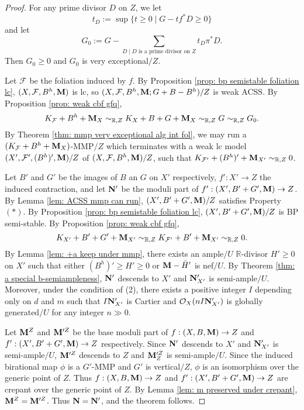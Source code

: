 \documentclass[11pt]{amsart}
\numberwithin{equation}{section}
\newcommand{\Mm}{{\bf{M}}}
\newcommand{\Nn}{{\bf{N}}}
\newcommand{\Rr}{\mathbb{R}}
\newcommand{\Ff}{\mathcal{F}}
\theoremstyle{definition}
\theoremstyle{definition}
\theoremstyle{definition}
\begin{document}
\begin{proof}
For any prime divisor $D$ on $Z$, we let 
$$t_D:=\sup\{t\geq 0\mid G-tf^*D\geq 0\}$$
and let 
$$G_0:=G-\sum_{D\mid D\text{ is a prime divisor on }Z}t_D\pi^*D.$$ 
Then $G_0\geq 0$ and $G_0$ is very exceptional$/Z$.

Let $\Ff$ be the foliation induced by $f$. By Proposition \ref{prop: bp semistable foliation lc}, $(X,\Ff,B^h,\Mm)$ is lc, so $(X,\Ff,B^h,\Mm;G+B-B^h)/Z$ is weak ACSS. By Proposition \ref{prop: weak cbf gfq}, $$K_{\Ff}+B^h+\Mm_X\sim_{\mathbb R,Z}K_X+B+G+\Mm_X\sim_{\mathbb R,Z}G\sim_{\mathbb R,Z}G_0.$$
By Theorem \ref{thm: mmp very exceptional alg int fol}, we may run a $(K_{\Ff}+B^h+\Mm_X)$-MMP$/Z$ which terminates with a weak lc model $(X',\Ff',(B^h)',\Mm)/Z$ of $(X,\Ff,B^h,\Mm)/Z$, such that $K_{\Ff'}+(B^h)'+\Mm_{X'}\sim_{\mathbb R,Z}0$. 

Let $B'$ and $G'$ be the images of $B$ an $G$ on $X'$ respectively, $f': X'\rightarrow Z$ the induced contraction, and let $\Nn'$ be the moduli part of $f': (X',B'+G',\Mm)\rightarrow Z$. By Lemma \ref{lem: ACSS mmp can run}, $(X',B'+G',\Mm)/Z$ satisfies Property $(*)$. By Proposition \ref{prop: bp semistable foliation lc}, $(X',B'+G',\Mm)/Z$ is BP semi-stable. By Proposition \ref{prop: weak cbf gfq}, $$K_{X'}+B'+G'+\Mm_{X'}\sim_{\mathbb R,Z}K_{\Ff'}+B'+\Mm_{X'}\sim_{\mathbb R,Z}0.$$
By Lemma \ref{lem: +a keep under mmp}, there exists an ample$/U$ $\Rr$-divisor $H'\geq 0$ on $X'$ such that either $(B^h)'\geq H'\geq 0$ or $\Mm-\bar H'$ is nef$/U$. By Theorem \ref{thm: a special b-semiampleness}, $\Nn'$ descends to $X'$ and $\Nn'_{X'}$ is semi-ample$/U$. Moreover, under the condition of (2), there exists a positive integer $I$ depending only on $d$ and $m$ such that $I\Nn'_{X'}$ is Cartier and $\mathcal{O}_X(nI\Nn'_{X'})$ is globally generated$/U$ for any integer $n\gg 0$.

Let $\Mm^Z$ and $\Mm'^Z$ be the base moduli part of $f: (X,B,\Mm)\rightarrow Z$ and $f': (X',B'+G',\Mm)\rightarrow Z$ respectively. Since $\Nn'$ descends to $X'$ and $\Nn'_{X'}$ is semi-ample$/U$, $\Mm'^Z$ descends to $Z$ and $\Mm'^Z_Z$ is semi-ample$/U$. Since the induced birational map $\phi$ is a $G'$-MMP and $G'$ is vertical$/Z$, $\phi$ is an isomorphism over the generic point of $Z$. Thus $f: (X,B,\Mm)\rightarrow Z$ and $f': (X',B'+G',\Mm)\rightarrow Z$ are crepant over the generic point of $Z$. By Lemma \ref{lem: m preserved under crepant}, $\Mm^Z=\Mm'^Z$. Thus $\Nn=\Nn'$, and the theorem follows.
\end{proof}
\end{document}
